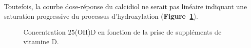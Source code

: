 \documentclass[
  a4paper,
  DIV=11,
  numbers=noendperiod,
  listof=totoc]{scrreprt}
\begin{document}
Toutefois, la courbe dose-réponse du calcidiol ne serait pas linéaire
indiquant une saturation progressive du processus d'hydroxylation
\autocite{Garland.2011,IOM.2011}
(\textbf{Figure~\ref{fig-vd-pk-heaney}}).

\begin{figure}

\begin{minipage}[t]{0.50\linewidth}

{\centering 


\caption{\label{fig-vd-pk-heaney}Concentration 25(OH)D en fonction de la
prise de suppléments de vitamine D. \autocite{Heaney.2015}}

}

\end{minipage}%
%
\begin{minipage}[t]{0.50\linewidth}

{\centering 

\raisebox{-\height}{

}}
\end{minipage}
\end{figure}
\end{document}
